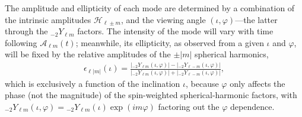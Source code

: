 \documentclass[aps,prd,twocolumn,superscriptaddress,preprintnumbers,floatfix,nofootinbib]{revtex4-2}
\newcommand*{\eq}[1]{Eq.~\eqref{eq:#1}}
\begin{document}
The amplitude and ellipticity of each mode are determined by a combination of the intrinsic amplitudes $\mathcal{H}_{\ell \pm m}$, and the viewing angle $(\iota, \varphi)$---the latter through the ${}_{-2} Y_{\ell m}$ factors.
The intensity of the mode will vary with time following $\mathcal{A}_{\ell m}(t)$; meanwhile, its ellipticity, as observed from a given $\iota$ and $\varphi$, will be fixed by the relative amplitudes of the $\pm|m|$ spherical harmonics,
\begin{align}
\epsilon_{\ell|m|}(\iota) = \frac{\left|{}_{-2} Y_{\ell m}(\iota,\varphi)\right| - \left|{}_{-2} Y_{\ell -m}(\iota,\varphi)\right|}{\left|{}_{-2} Y_{\ell m}(\iota,\varphi)\right| + \left|{}_{-2} Y_{\ell -m}(\iota,\varphi)\right|} ,
\end{align}
which is exclusively a function of the inclination $\iota$, because $\varphi$ only affects the phase (not the magnitude) of the spin-weighted spherical-harmonic factors, with ${}_{-2} Y_{\ell m}(\iota,\varphi) = {}_{-2} Y_{\ell m}(\iota) \exp(i m \varphi)$ factoring out the $\varphi$ dependence.

\end{document}
